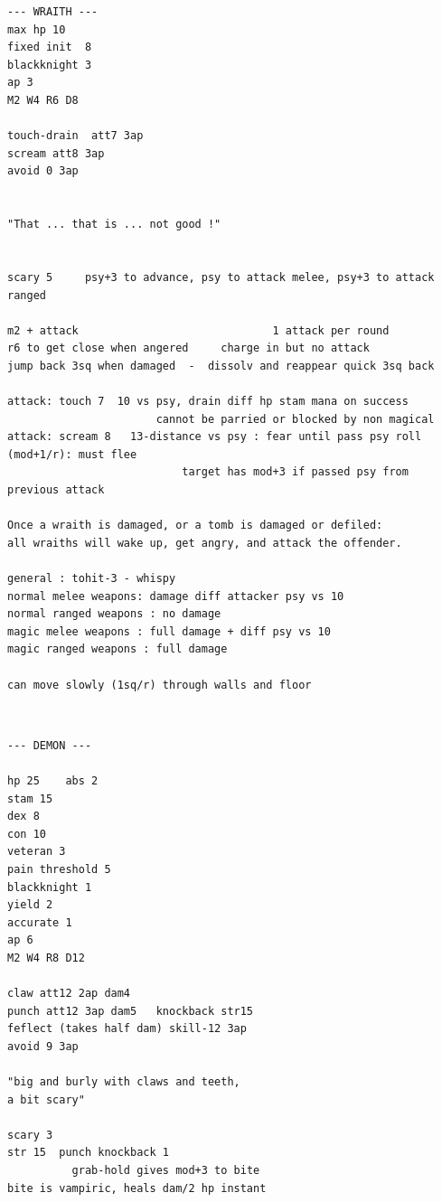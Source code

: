 \begin{samepage}
\small \begin{verbatim}
--- WRAITH ---
max hp 10
fixed init  8
blackknight 3
ap 3
M2 W4 R6 D8

touch-drain  att7 3ap
scream att8 3ap
avoid 0 3ap


"That ... that is ... not good !"


scary 5     psy+3 to advance, psy to attack melee, psy+3 to attack ranged

m2 + attack                              1 attack per round
r6 to get close when angered     charge in but no attack
jump back 3sq when damaged  -  dissolv and reappear quick 3sq back

attack: touch 7  10 vs psy, drain diff hp stam mana on success
                       cannot be parried or blocked by non magical
attack: scream 8   13-distance vs psy : fear until pass psy roll (mod+1/r): must flee
                           target has mod+3 if passed psy from previous attack

Once a wraith is damaged, or a tomb is damaged or defiled:
all wraiths will wake up, get angry, and attack the offender.

general : tohit-3 - whispy
normal melee weapons: damage diff attacker psy vs 10
normal ranged weapons : no damage
magic melee weapons : full damage + diff psy vs 10
magic ranged weapons : full damage

can move slowly (1sq/r) through walls and floor
\end{verbatim} \normalsize
\end{samepage}

\

\goodbreak
\begin{samepage}
\small \begin{verbatim}
--- DEMON ---

hp 25    abs 2
stam 15
dex 8
con 10
veteran 3
pain threshold 5
blackknight 1
yield 2
accurate 1
ap 6
M2 W4 R8 D12

claw att12 2ap dam4
punch att12 3ap dam5   knockback str15
feflect (takes half dam) skill-12 3ap
avoid 9 3ap

"big and burly with claws and teeth,
a bit scary"

scary 3
str 15  punch knockback 1
          grab-hold gives mod+3 to bite
bite is vampiric, heals dam/2 hp instant
\end{verbatim} \normalsize
\end{samepage}









